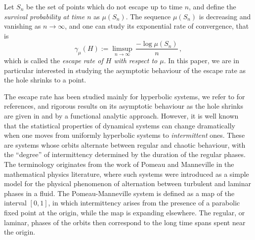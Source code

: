 \documentclass{amsart}
\theoremstyle{definition}
\theoremstyle{remark}
\theoremstyle{definition}
\numberwithin{equation}{section}
\begin{document}
Let $S_n$ be the set of points which do not escape up to time $n$, and define the \emph{survival probability at time $n$} as $\mu(S_n)$. The sequence $\mu(S_n)$ is decreasing and vanishing as $n\to \infty$, and one can study its exponential rate of convergence, that is 
\[
\gamma_\mu(H) := \limsup_{n\to \infty}\, \frac{-\log \mu(S_n)}{n}\, ,
\]
which is called the \emph{escape rate of $H$ with respect to $\mu$}. In this paper, we are in particular interested in studying the asymptotic behaviour of the escape rate as the hole shrinks to a point.

The escape rate has been studied mainly for hyperbolic systems, we refer to \cite{DY} for references, and rigorous results on its asymptotic behaviour as the hole shrinks are given in \cite{KL} and \cite{PU} by a functional analytic approach. However, it is well known that the statistical properties of dynamical systems can change dramatically when one moves from uniformly hyperbolic systems to \emph{intermittent} ones. These are systems whose orbits alternate between regular and chaotic behaviour, with the ``degree'' of intermittency determined by the duration of the regular phases. The terminology originates from the work of Pomeau and Manneville \cite{PM} in the mathematical physics literature, where such systems were introduced as a simple model for the physical phenomenon of alternation between turbulent and laminar phases in a fluid. The Pomeau-Manneville system is defined as a map of the interval $[0,1]$, in which intermittency arises from the presence of a parabolic fixed point at the origin, while the map is expanding elsewhere. The regular, or laminar, phases of the orbits then correspond to the long time spans spent near the origin.
\end{document}
